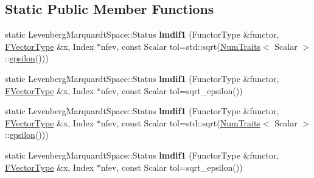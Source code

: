 \subsection*{Static Public Member Functions}
\begin{DoxyCompactItemize}
\item 
\mbox{\label{class_eigen_1_1_levenberg_marquardt_a03d503a4bd73715bb770e3e4c659d4ab}} 
static Levenberg\+Marquardt\+Space\+::\+Status {\bfseries lmdif1} (Functor\+Type \&functor, \hyperlink{group___core___module}{F\+Vector\+Type} \&x, Index $\ast$nfev, const Scalar tol=std\+::sqrt(\hyperlink{group___core___module_struct_eigen_1_1_num_traits}{Num\+Traits}$<$ Scalar $>$\+::\hyperlink{class_eigen_1_1_levenberg_marquardt_aac799068926ca0bc3387b2dc5c0eb113}{epsilon}()))
\item 
\mbox{\label{class_eigen_1_1_levenberg_marquardt_a85defc7cf1063f2595b5f5766db4647f}} 
static Levenberg\+Marquardt\+Space\+::\+Status {\bfseries lmdif1} (Functor\+Type \&functor, \hyperlink{group___core___module}{F\+Vector\+Type} \&x, Index $\ast$nfev, const Scalar tol=sqrt\+\_\+epsilon())
\item 
\mbox{\label{class_eigen_1_1_levenberg_marquardt_a5107d743e7e0aa1d7889826f19d192a7}} 
static Levenberg\+Marquardt\+Space\+::\+Status {\bfseries lmdif1} (Functor\+Type \&functor, \hyperlink{group___core___module}{F\+Vector\+Type} \&x, Index $\ast$nfev, const Scalar tol=std\+::sqrt(\hyperlink{group___core___module_struct_eigen_1_1_num_traits}{Num\+Traits}$<$ Scalar $>$\+::\hyperlink{class_eigen_1_1_levenberg_marquardt_aac799068926ca0bc3387b2dc5c0eb113}{epsilon}()))
\item 
\mbox{\label{class_eigen_1_1_levenberg_marquardt_a85defc7cf1063f2595b5f5766db4647f}} 
static Levenberg\+Marquardt\+Space\+::\+Status {\bfseries lmdif1} (Functor\+Type \&functor, \hyperlink{group___core___module}{F\+Vector\+Type} \&x, Index $\ast$nfev, const Scalar tol=sqrt\+\_\+epsilon())
\end{DoxyCompactItemize}

